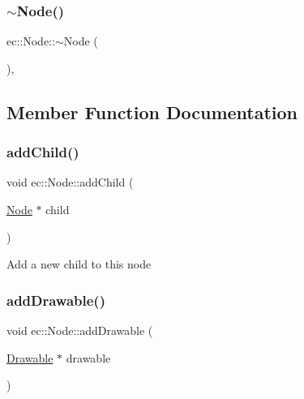 \mbox{\label{classec_1_1_node_a6b2dfa6d2490ec46a5d15a326780889b}} 
\subsubsection{\texorpdfstring{$\sim$\+Node()}{~Node()}}
{\footnotesize\ttfamily ec\+::\+Node\+::$\sim$\+Node (\begin{DoxyParamCaption}{ }\end{DoxyParamCaption})\hspace{0.3cm}{\ttfamily [virtual]}, {\ttfamily [default]}}



\subsection{Member Function Documentation}
\mbox{\label{classec_1_1_node_a647bcdef4e01de3ecb34e0917ba9e333}} 
\subsubsection{\texorpdfstring{add\+Child()}{addChild()}}
{\footnotesize\ttfamily void ec\+::\+Node\+::add\+Child (\begin{DoxyParamCaption}\item[{\mbox{\hyperlink{classec_1_1_node}{Node}} $\ast$}]{child }\end{DoxyParamCaption})}

Add a new child to this node \mbox{\label{classec_1_1_node_aef615bcf1c24225838e00c15d03dc707}} 
\subsubsection{\texorpdfstring{add\+Drawable()}{addDrawable()}}
{\footnotesize\ttfamily void ec\+::\+Node\+::add\+Drawable (\begin{DoxyParamCaption}\item[{\mbox{\hyperlink{classec_1_1_drawable}{Drawable}} $\ast$}]{drawable }\end{DoxyParamCaption})}


